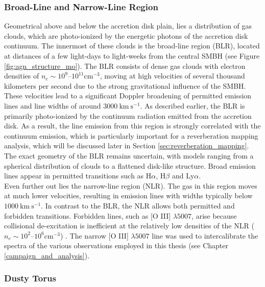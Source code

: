 \subsubsection{Broad-Line and Narrow-Line Region}

Geometrical above and below the accretion disk plain, lies a distribution of gas clouds, which are photo-ionized by the energetic photons of the accretion disk continuum. The innermost of these clouds is the broad-line region (BLR), located at distances of a few light-days to light-weeks from the central SMBH (see Figure \ref{fig:agn_structure_mo}). The BLR consists of dense gas clouds with electron densities of $n_e \sim 10^9$–$10^{11} \mathrm{cm^{-3}}$, moving at high velocities of several thousand kilometers per second due to the strong gravitational influence of the SMBH. These velocities lead to a significant Doppler broadening of permitted emission lines and line widths of around $3000\ \mathrm{km \ s^{-1}}$. As described earlier, the BLR is primarily photo-ionized by the continuum radiation emitted from the accretion disk. As a result, the line emission from this region is strongly correlated with the continuum emission, which is particularly important for a reverberation mapping analysis, which will be discussed later in Section \ref{sec:reverberation_mapping}.\\ The exact geometry of the BLR remains uncertain, with models ranging from a spherical distribution of clouds to a flattened disk-like structure. Broad emission lines appear in permitted transitions such as H$\alpha$, H$\beta$ and Ly$\alpha$. \parencite{netzer2013agn, osterbrock1989agn, peterson1997introduction}
\\
Even further out lies the narrow-line region (NLR). The gas in this region moves at much lower velocities, resulting in emission lines with widths typically below $1000\ \mathrm{km \ s^{-1}}$. In contrast to the BLR, the NLR allows both permitted and forbidden transitions. Forbidden lines, such as [O III] $\lambda5007$, arise because collisional de-excitation is inefficient at the relatively low densities of the NLR ($n_e \sim 10^2$–$10^6 \mathrm{cm^{-3}}$) \parencite{osterbrock1989agn}. The narrow [O III] $\lambda5007$ line was used to intercalibrate the spectra of the various observations employed in this thesis (see Chapter \ref{campaign_and_analysis}).




\subsubsection{Dusty Torus}

